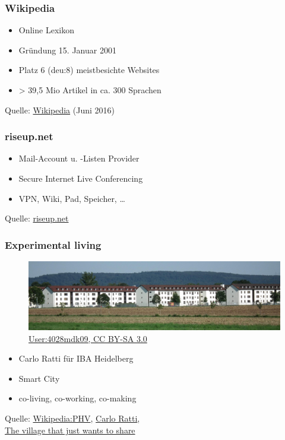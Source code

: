 \begin{frame}
	\frametitle{Wikipedia}

	\begin{itemize}
		\item Online Lexikon
		\item Gründung 15. Januar 2001
		\item Platz 6 (deu:8) meistbesichte Websites
		\item > 39,5 Mio Artikel in ca. 300 Sprachen
	\end{itemize}

	Quelle: \href{https://de.wikipedia.org/wiki/Wikipedia}{Wikipedia} (Juni 2016)
\end{frame}

\begin{frame}
	\frametitle{riseup.net}
	
	\begin{itemize}
		\item Mail-Account u. -Listen Provider
		\item Secure Internet Live Conferencing
		\item VPN, Wiki, Pad, Speicher, …
	\end{itemize}
	
	Quelle: \href{https://riseup.net/}{riseup.net}
\end{frame}

\begin{frame}
	\frametitle{Experimental living}
	
	\begin{figure}
		\includegraphics[height=0.2\textheight]{img/Wohnhaeuser_PHV_cut.jpg}
		\caption[Blick von Norden auf PHV, Ausschnitt]{\href{https://de.wikipedia.org/wiki/Datei:Wohnh\%C3\%A4user_PHV.JPG}{User:4028mdk09, CC BY-SA 3.0}}
	\end{figure}
	
	\begin{itemize}
		\item Carlo Ratti für IBA Heidelberg
		\item Smart City
		\item co-living, co-working, co-making
	\end{itemize}

	Quelle: \href{https://de.wikipedia.org/wiki/Patrick-Henry-Village}{Wikipedia:PHV}, \hspace{1cm}
	\href{http://www.carloratti.com/project/patrick-henry-commune/}{Carlo Ratti}, \\
	\href{http://www.bbc.co.uk/news/technology-37510322}{The village that just wants to share}
\end{frame}

